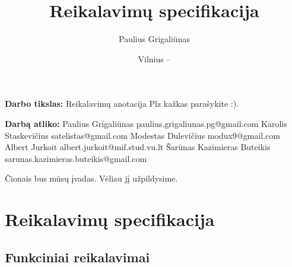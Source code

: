\documentclass{VUMIFPSkursinis}
\title{Reikalavimų specifikacija}
\author{Paulius Grigaliūnas}
\date{Vilnius – \the\year}
\begin{document}
\maketitle
\cleardoublepage{}
\setcounter{page}{2}



{\bfseries Darbo tikslas:} Reikalavimų anotacija Plz kažkas parašykite :). 
\newline
\newline
\newline

\noindent
{\bfseries Darbą atliko:}
\newline
\newline
\newline
Paulius Grigaliūnas
\newline
paulius.grigaliunas.pg@gmail.com
\newline
\newline
\newline
Karolis Staskevičius
\newline
satelistas@gmail.com
\newline
\newline
\newline
Modestas Dulevičius
\newline
modux9@gmail.com
\newline
\newline
\newline
Albert Jurkoit
\newline
albert.jurkoit@mif.stud.vu.lt
\newline
\newline
\newline
Šarūnas Kazimieras Buteikis
\newline
sarunas.kazimieras.buteikis@gmail.com

\tableofcontents


Čionais bus mūsų įvadas. Vėliau jį užpildysime.
\newline

\section{Reikalavimų specifikacija}
\subsection{Funkciniai reikalavimai}
\end{document}
